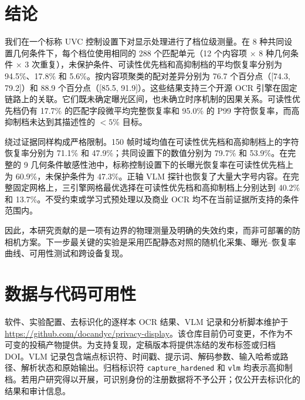 \documentclass{ieeeaccess}
\begin{document}
\section{结论}
\label{sec:conclusion}

我们在一个标称 UVC 控制设置下对显示处理进行了档位级测量。在 8 种共同设置几何条件下，每个档位使用相同的 288 个匹配单元（12 个内容项 $\times$ 8 种几何条件 $\times$ 3 次重复），未保护条件、可读性优先档和高抑制档的平均恢复率分别为 94.5\%、17.8\% 和 5.6\%。按内容项聚类的配对差异分别为 76.7 个百分点（[74.3, 79.2]）和 88.9 个百分点（[85.5, 91.9]）。这些结果支持三个开源 OCR 引擎在固定链路上的关联。它们既未确定曝光区间，也未确立时序机制的因果关系。可读性优先档仍有 17.7\% 的匹配字段微平均完整恢复率和 95.0\% 的 P99 字符恢复率，而高抑制档未达到其描述性的 $<5\%$ 目标。

绕过证据同样构成严格限制。150 帧时域均值在可读性优先档和高抑制档上的字符恢复率分别为 71.1\% 和 47.9\%；共同设置下的数值分别为 79.7\% 和 53.9\%。在完整的 9 几何条件敏感性池中，标称控制设置下的长曝光恢复率在可读性优先档上为 60.9\%，未保护条件为 47.3\%。正轴 VLM 探针也恢复了大量大字号内容。在完整固定网格上，三引擎网格最优选择在可读性优先档和高抑制档上分别达到 40.2\% 和 13.7\%。不受约束或学习式预处理以及商业 OCR 均不在当前证据所支持的条件范围内。

因此，本研究贡献的是一项有边界的物理测量及明确的失效约束，而非可部署的防相机方案。下一步最关键的实验是采用匹配静态对照的随机化采集、曝光--恢复率曲线、可用性测试和跨设备复现。

\section*{数据与代码可用性}

软件、实验配置、去标识化的逐样本 OCR 结果、VLM 记录和分析脚本维护于 \url{https://github.com/docandyc/privacy-display}。该仓库目前仍可变更，不作为不可变的投稿产物提供。为支持复现，定稿版本将提供冻结的发布标签或归档 DOI。VLM 记录包含端点标识符、时间戳、提示词、解码参数、输入哈希或路径、解析状态和原始输出。归档标识符 \texttt{capture\_hardened} 和 \texttt{vlm} 均表示高抑制档。若用户研究得以开展，可识别身份的注册数据将不予公开；仅公开去标识化的结果和审计信息。

\end{document}
